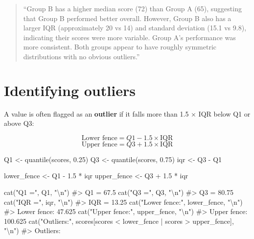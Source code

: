 \documentclass[
  11pt,
  a4paper,
  oneside,
  open=any]{scrbook}
\newenvironment{Shaded}{\begin{snugshade}}{\end{snugshade}}
\newcommand{\CommentTok}[1]{\textcolor[rgb]{0.37,0.37,0.37}{#1}}
\newcommand{\FloatTok}[1]{\textcolor[rgb]{0.68,0.00,0.00}{#1}}
\newcommand{\FunctionTok}[1]{\textcolor[rgb]{0.28,0.35,0.67}{#1}}
\newcommand{\NormalTok}[1]{\textcolor[rgb]{0.00,0.23,0.31}{#1}}
\newcommand{\OtherTok}[1]{\textcolor[rgb]{0.00,0.23,0.31}{#1}}
\newcommand{\SpecialCharTok}[1]{\textcolor[rgb]{0.37,0.37,0.37}{#1}}
\newcommand{\StringTok}[1]{\textcolor[rgb]{0.13,0.47,0.30}{#1}}
\begin{document}
\begin{quote}
``Group B has a higher median score (72) than Group A (65), suggesting
that Group B performed better overall. However, Group B also has a
larger IQR (approximately 20 vs 14) and standard deviation (15.1 vs
9.8), indicating their scores were more variable. Group A's performance
was more consistent. Both groups appear to have roughly symmetric
distributions with no obvious outliers.''
\end{quote}

\section{Identifying outliers}\label{identifying-outliers}

A value is often flagged as an \textbf{outlier} if it falls more than
1.5 × IQR below Q1 or above Q3:

\[\text{Lower fence} = Q1 - 1.5 \times \text{IQR}\]
\[\text{Upper fence} = Q3 + 1.5 \times \text{IQR}\]

\begin{Shaded}
\begin{Highlighting}[]
\NormalTok{Q1  }\OtherTok{\textless{}{-}} \FunctionTok{quantile}\NormalTok{(scores, }\FloatTok{0.25}\NormalTok{)}
\NormalTok{Q3  }\OtherTok{\textless{}{-}} \FunctionTok{quantile}\NormalTok{(scores, }\FloatTok{0.75}\NormalTok{)}
\NormalTok{iqr }\OtherTok{\textless{}{-}}\NormalTok{ Q3 }\SpecialCharTok{{-}}\NormalTok{ Q1}

\NormalTok{lower\_fence }\OtherTok{\textless{}{-}}\NormalTok{ Q1 }\SpecialCharTok{{-}} \FloatTok{1.5} \SpecialCharTok{*}\NormalTok{ iqr}
\NormalTok{upper\_fence }\OtherTok{\textless{}{-}}\NormalTok{ Q3 }\SpecialCharTok{+} \FloatTok{1.5} \SpecialCharTok{*}\NormalTok{ iqr}

\FunctionTok{cat}\NormalTok{(}\StringTok{"Q1 ="}\NormalTok{, Q1, }\StringTok{"}\SpecialCharTok{\textbackslash{}n}\StringTok{"}\NormalTok{)}
\CommentTok{\#\textgreater{} Q1 = 67.5}
\FunctionTok{cat}\NormalTok{(}\StringTok{"Q3 ="}\NormalTok{, Q3, }\StringTok{"}\SpecialCharTok{\textbackslash{}n}\StringTok{"}\NormalTok{)}
\CommentTok{\#\textgreater{} Q3 = 80.75}
\FunctionTok{cat}\NormalTok{(}\StringTok{"IQR ="}\NormalTok{, iqr, }\StringTok{"}\SpecialCharTok{\textbackslash{}n}\StringTok{"}\NormalTok{)}
\CommentTok{\#\textgreater{} IQR = 13.25}
\FunctionTok{cat}\NormalTok{(}\StringTok{"Lower fence:"}\NormalTok{, lower\_fence, }\StringTok{"}\SpecialCharTok{\textbackslash{}n}\StringTok{"}\NormalTok{)}
\CommentTok{\#\textgreater{} Lower fence: 47.625}
\FunctionTok{cat}\NormalTok{(}\StringTok{"Upper fence:"}\NormalTok{, upper\_fence, }\StringTok{"}\SpecialCharTok{\textbackslash{}n}\StringTok{"}\NormalTok{)}
\CommentTok{\#\textgreater{} Upper fence: 100.625}
\FunctionTok{cat}\NormalTok{(}\StringTok{"Outliers:"}\NormalTok{, scores[scores }\SpecialCharTok{\textless{}}\NormalTok{ lower\_fence }\SpecialCharTok{|}\NormalTok{ scores }\SpecialCharTok{\textgreater{}}\NormalTok{ upper\_fence], }\StringTok{"}\SpecialCharTok{\textbackslash{}n}\StringTok{"}\NormalTok{)}
\CommentTok{\#\textgreater{} Outliers:}
\end{Highlighting}
\end{Shaded}
\end{document}
